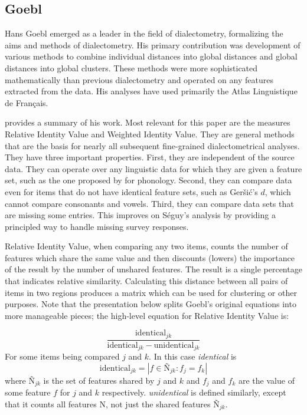 \documentclass[11pt]{article}
\begin{document}
\subsection{Goebl}

Hans Goebl emerged as a leader in the field of dialectometry,
formalizing the aims and methods of dialectometry. His primary
contribution was development of various methods to combine individual
distances into global distances and global distances into global clusters. These
methods were more sophisticated mathematically than previous
dialectometry and operated on any features extracted from the data. His
analyses have used primarily the Atlas Linguistique de Fran\c{c}ais.

 provides a summary of his work. Most relevant for
this paper are the measures Relative Identity Value and Weighted
Identity Value. They are general methods that are the basis for nearly
all subsequent fine-grained dialectometrical analyses. They have three
important properties. First, they are independent of the source
data. They can operate over any linguistic data for which they are
given a feature set, such as the one proposed by  for
phonology. Second, they can compare data even for items that do not
have identical feature sets, such as Ger\v{s}i\'c's $d$,
which cannot compare consonants and vowels. Third, they can compare
data sets that are missing some entries. This improves on S\'eguy's
analysis by providing a principled way to handle missing survey
responses.

Relative Identity Value, when comparing any two items, counts the
number of features which share the same value and then discounts
(lowers) the importance of the result by the number of unshared
features. The result is a single percentage that indicates
relative similarity. Calculating this distance between all pairs
of items in two regions produces a matrix which can be used for
clustering or other purposes. Note that the presentation below splits
Goebl's original equations into more manageable pieces; the high-level
equation for Relative Identity Value is:

\begin{equation}
  \frac{\textrm{identical}_{jk}} {\textrm{identical}_{jk} - \textrm{unidentical}_{jk}}
\label{riv}
\end{equation}
For some items being compared $j$ and $k$. In this case
\textit{identical} is
\begin{equation}
  \textrm{identical}_{jk} = |f \in \textrm{\~N}_{jk} : f_j = f_k|
\end{equation}
where $\textrm{\~N}_{jk}$ is the set of features shared by  $j$ and
$k$ and $f_j$ and $f_k$ are the value of some feature $f$ for $j$ and
$k$ respectively. \textit{unidentical} is defined similarly, except
that it counts all features N, not just the shared features
$\textrm{\~N}_{jk}$.
\end{document}
